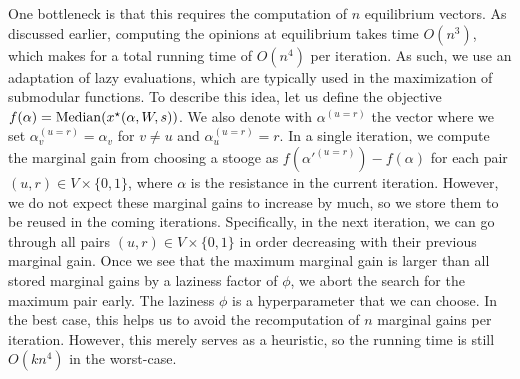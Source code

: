 One bottleneck is that this requires
the computation of $n$ equilibrium
vectors. As discussed earlier,
computing the opinions at equilibrium
takes time $O(n^3)$, which makes for
a total running time of $O(n^4)$ per
iteration.
As such, we use an adaptation of lazy
evaluations, which are typically used
in the maximization of submodular
functions.
To describe this idea, let us
define the objective
$f(\alpha) = \mathrm{Median}(x^\star(\alpha, W, s))$.
We also denote with $\alpha^{(u=r)}$
the vector where we set
$\alpha^{(u=r)}_v = \alpha_v$ for $v \not= u$
and $\alpha^{(u=r)}_u = r$. In a single
iteration, we compute the marginal
gain from choosing a stooge as
$f(\alpha'^{(u=r)}) - f(\alpha)$ for each
pair $(u, r) \in V \times \{0, 1\}$,
where $\alpha$ is the resistance
in the current iteration.
However, we do not expect these
marginal gains to increase by much,
so we store them to be reused
in the coming iterations.
Specifically, in the next iteration,
we can go through all pairs
$(u, r) \in V \times \{0, 1\}$
in order decreasing with their
previous marginal gain.
Once we see that the maximum
marginal gain is larger than
all stored marginal gains by
a laziness factor of $\phi$,
we abort the search for the maximum
pair early.
The laziness $\phi$ is a
hyperparameter that we can choose.
In the best case, this helps
us to avoid the recomputation of
$n$ marginal gains per iteration.
However, this merely serves as
a heuristic, so the running time
is still $O(k n^4)$ in the worst-case.



